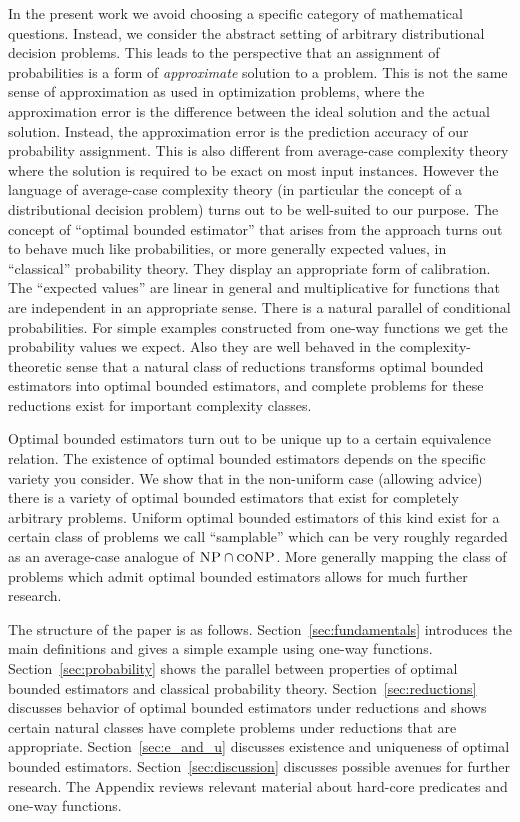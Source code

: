 \documentclass{article}
\numberwithin{equation}{section}
\theoremstyle{definition}
\theoremstyle{plain}
\begin{document}
In the present work we avoid choosing a specific category of mathematical questions. Instead, we consider the abstract setting of arbitrary distributional decision problems. This leads to the perspective that an assignment of probabilities is a form of \emph{approximate} solution to a problem. This is not the same sense of approximation as used in optimization problems, where the approximation error is the difference between the ideal solution and the actual solution. Instead, the approximation error is the prediction accuracy of our probability assignment. This is also different from average-case complexity theory where the solution is required to be exact on most input instances. However the language of average-case complexity theory (in particular the concept of a distributional decision problem) turns out to be well-suited to our purpose.
The concept of \enquote{optimal bounded estimator} that arises from the approach turns out to behave much like probabilities, or more generally expected values, in \enquote{classical} probability theory. They display an appropriate form of calibration. The \enquote{expected values} are linear in general and multiplicative for functions that are independent in an appropriate sense. There is a natural parallel of conditional probabilities. For simple examples constructed from one-way functions we get the probability values we expect. Also they are well behaved in the complexity-theoretic sense that a natural class of reductions transforms optimal bounded estimators into optimal bounded estimators, and complete problems for these reductions exist for important complexity classes.

Optimal bounded estimators turn out to be unique up to a certain equivalence relation. The existence of optimal bounded estimators depends on the specific variety you consider. We show that in the non-uniform case (allowing advice) there is a variety of optimal bounded estimators that exist for completely arbitrary problems. Uniform optimal bounded estimators of this kind exist for a certain class of problems we call \enquote{samplable} which can be very roughly regarded as an average-case analogue of $\textsc{NP} \cap \textsc{coNP}$. More generally mapping the class of problems which admit optimal bounded estimators allows for much further research.

The structure of the paper is as follows. Section~\ref{sec:fundamentals} introduces the main definitions and gives a simple example using one-way functions. Section~\ref{sec:probability} shows the parallel between properties of optimal bounded estimators and classical probability theory. Section~\ref{sec:reductions} discusses behavior of optimal bounded estimators under reductions and shows certain natural classes have complete problems under reductions that are appropriate. Section~\ref{sec:e_and_u} discusses existence and uniqueness of optimal bounded estimators. Section~\ref{sec:discussion} discusses possible avenues for further research. The Appendix reviews relevant material about hard-core predicates and one-way functions.
\end{document}
